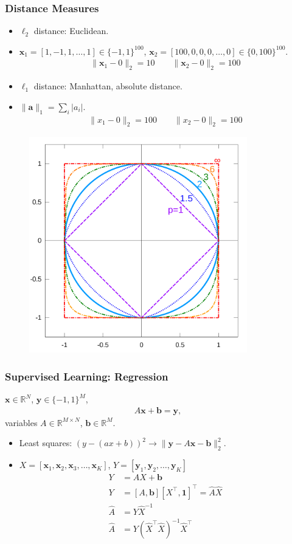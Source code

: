\documentclass[a4,xcolor=dvipsnames]{beamer}
\def\R{\mathbb{R}}
\def\a{\mathbf{a}}
\def\b{\mathbf{b}}
\def\x{\mathbf{x}}
\def\y{\mathbf{y}}
\begin{document}
\begin{frame}
    \frametitle{Distance Measures}
    \scriptsize
\begin{itemize}
    \item $\ell_2$ distance: Euclidean.
    \item $\x_1 = [1,-1,1,\dots,1]\in\{-1,1\}^{100}$, $\x_2 = [100,0,0,0,\dots,0]\in\{0,100\}^{100}$.
    \begin{gather}
        \|\x_1-0\|_2 = 10  \qquad \|\x_2-0\|_2 = 100
    \end{gather}
    \item $\ell_1$ distance: Manhattan, absolute distance.
    \item $\|\a\|_1 = \sum_{i} |a_i|$.
    \begin{gather}
        \|x_1-0\|_2 = 100  \qquad \|x_2-0\|_2 = 100
    \end{gather}
\end{itemize}
\begin{figure}
    \centering
    \includegraphics[width=.4\textwidth]{norms.png}
\end{figure}
\end{frame}

\begin{frame}
    \frametitle{Supervised Learning: Regression}
    $\mathbf{x} \in \mathbb{R}^N$, $\y\in \{-1,1\}^M$,
    \begin{gather}
        A\mathbf{x}+\mathbf{b} = \mathbf{y},
    \end{gather}
    variables $A\in\mathbb{R}^{M\times N}$, $\b\in\R^{M}$.
    \begin{itemize}
        \item Least squares: $(y-(ax+b))^2 \rightarrow \|\y-A\x-\b\|_2^2$.
        \item $X = [\x_1, \x_2, \x_3,\dots, \x_K]$, $Y = [\y_1, \y_2, \dots, \y_K]$ 
        \begin{align*}
            Y &= AX + \b \\
            Y &= [A, \b] [X^\top, \mathbf{1}]^\top = \hat{A} \hat{X} \\
            \hat{A} & = Y \hat{X}^{-1} \\
            \hat{A} &= Y(\hat{X}^\top\hat{X})^{-1}\hat{X}^\top 
        \end{align*}
    \end{itemize}
\end{frame}
\end{document}

